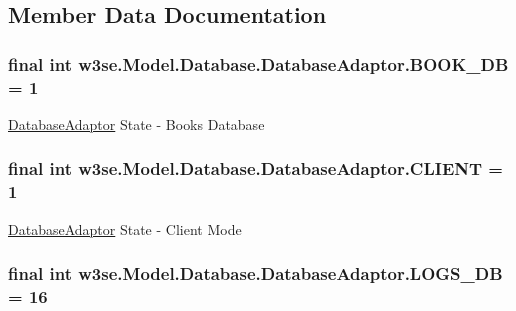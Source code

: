 \subsection{Member Data Documentation}
\hypertarget{classw3se_1_1_model_1_1_database_1_1_database_adaptor_ae9a723ec22a2faffd833796f7afeb6ef}{
\subsubsection[{B\-O\-O\-K\-\_\-\-D\-B}]{\setlength{\rightskip}{0pt plus 5cm}final int w3se.\-Model.\-Database.\-Database\-Adaptor.\-B\-O\-O\-K\-\_\-\-D\-B = 1\hspace{0.3cm}{\ttfamily [static]}}}\label{classw3se_1_1_model_1_1_database_1_1_database_adaptor_ae9a723ec22a2faffd833796f7afeb6ef}
\hyperlink{classw3se_1_1_model_1_1_database_1_1_database_adaptor}{Database\-Adaptor} State -\/ Books Database \hypertarget{classw3se_1_1_model_1_1_database_1_1_database_adaptor_a2c5a2b62c46dcf90c0585fa6bb721d01}{
\subsubsection[{C\-L\-I\-E\-N\-T}]{\setlength{\rightskip}{0pt plus 5cm}final int w3se.\-Model.\-Database.\-Database\-Adaptor.\-C\-L\-I\-E\-N\-T = 1\hspace{0.3cm}{\ttfamily [static]}}}\label{classw3se_1_1_model_1_1_database_1_1_database_adaptor_a2c5a2b62c46dcf90c0585fa6bb721d01}
\hyperlink{classw3se_1_1_model_1_1_database_1_1_database_adaptor}{Database\-Adaptor} State -\/ Client Mode \hypertarget{classw3se_1_1_model_1_1_database_1_1_database_adaptor_a39191eb3e12600bd39ded42ed4ef2707}{
\subsubsection[{L\-O\-G\-S\-\_\-\-D\-B}]{\setlength{\rightskip}{0pt plus 5cm}final int w3se.\-Model.\-Database.\-Database\-Adaptor.\-L\-O\-G\-S\-\_\-\-D\-B = 16\hspace{0.3cm}{\ttfamily [static]}}}\label{classw3se_1_1_model_1_1_database_1_1_database_adaptor_a39191eb3e12600bd39ded42ed4ef2707}
